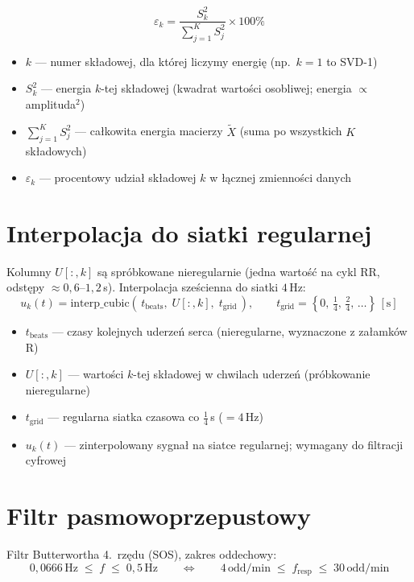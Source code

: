 \documentclass[12pt]{article}
\begin{document}
\[
  \varepsilon_k = \frac{S_k^2}{\displaystyle\sum_{j=1}^{K} S_j^2} \times 100\%
\]

\begin{itemize}
  \item $k$ — numer składowej, dla której liczymy energię (np.\ $k=1$ to SVD-1)
  \item $S_k^2$ — energia $k$-tej składowej (kwadrat wartości osobliwej; energia $\propto$ amplituda$^2$)
  \item $\sum_{j=1}^{K} S_j^2$ — całkowita energia macierzy $\tilde{X}$ (suma po wszystkich $K$ składowych)
  \item $\varepsilon_k$ — procentowy udział składowej $k$ w łącznej zmienności danych
\end{itemize}

\section*{Interpolacja do siatki regularnej}

Kolumny $U[:,k]$ są spróbkowane nieregularnie (jedna wartość na cykl RR, odstępy $\approx 0{,}6$--$1{,}2$\,s).
Interpolacja sześcienna do siatki $4\,\mathrm{Hz}$:
\[
  u_k(t) = \mathrm{interp\_cubic}\!\left(\,t_{\mathrm{beats}},\; U[:,k],\; t_{\mathrm{grid}}\,\right),
  \qquad t_{\mathrm{grid}} = \left\{0,\,\tfrac{1}{4},\,\tfrac{2}{4},\,\ldots\right\}\,[\mathrm{s}]
\]

\begin{itemize}
  \item $t_{\mathrm{beats}}$ — czasy kolejnych uderzeń serca (nieregularne, wyznaczone z załamków R)
  \item $U[:,k]$ — wartości $k$-tej składowej w chwilach uderzeń (próbkowanie nieregularne)
  \item $t_{\mathrm{grid}}$ — regularna siatka czasowa co $\tfrac{1}{4}$\,s ($= 4$\,Hz)
  \item $u_k(t)$ — zinterpolowany sygnał na siatce regularnej; wymagany do filtracji cyfrowej
\end{itemize}

\section*{Filtr pasmowoprzepustowy}

Filtr Butterwortha 4.~rzędu (SOS), zakres oddechowy:
\[
  0{,}0666\,\mathrm{Hz} \;\leq\; f \;\leq\; 0{,}5\,\mathrm{Hz}
  \qquad \Leftrightarrow \qquad
  4\,\mathrm{odd/min} \;\leq\; f_{\mathrm{resp}} \;\leq\; 30\,\mathrm{odd/min}
\]
\end{document}
